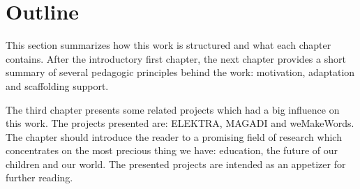 





\section{Outline}
This section summarizes how this work is structured and what each chapter contains.
After the introductory first chapter, the next chapter provides a short summary
of several pedagogic principles behind the work: motivation, adaptation and
scaffolding support.

The third chapter presents some related projects which had a big influence on this
work. The projects presented are: ELEKTRA, MAGADI and weMakeWords. The chapter should
introduce the reader to a promising field of research which concentrates on the most
precious thing we have: education, the future of our children and our world. The presented
projects are intended as an appetizer for further reading.

